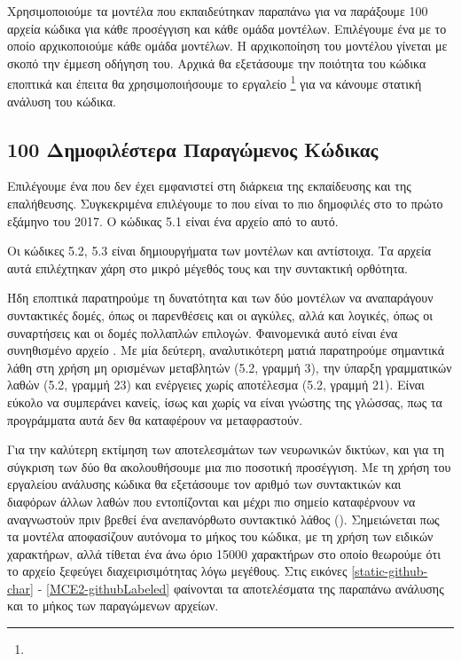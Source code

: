 Χρησιμοποιούμε τα μοντέλα που εκπαιδεύτηκαν παραπάνω για να παράξουμε 100 αρχεία κώδικα για κάθε προσέγγιση και κάθε ομάδα μοντέλων.
Επιλέγουμε ένα  με το οποίο αρχικοποιούμε κάθε ομάδα μοντέλων. 
Η αρχικοποίηση του μοντέλου γίνεται με σκοπό την έμμεση οδήγηση του.
Αρχικά θα εξετάσουμε την ποιότητα του κώδικα εποπτικά και έπειτα θα χρησιμοποιήσουμε το εργαλείο \footnote{} για να κάνουμε στατική ανάλυση του κώδικα.

\subsection{100 Δημοφιλέστερα  Παραγώμενος Κώδικας}

Επιλέγουμε ένα  που δεν έχει εμφανιστεί στη διάρκεια της εκπαίδευσης και της επαλήθευσης.
Συγκεκριμένα επιλέγουμε το  που είναι το πιο δημοφιλές  στο  το πρώτο εξάμηνο του 2017.
Ο κώδικας 5.1 είναι ένα αρχείο από το  αυτό.



Οι κώδικες 5.2, 5.3 είναι δημιουργήματα των μοντέλων  και  αντίστοιχα. Τα αρχεία αυτά επιλέχτηκαν χάρη στο μικρό μέγεθός τους και την συντακτική ορθότητα.

Ήδη εποπτικά παρατηρούμε τη δυνατότητα και των δύο μοντέλων να αναπαράγουν συντακτικές δομές, όπως οι παρενθέσεις και οι αγκύλες, αλλά και λογικές, όπως οι συναρτήσεις και οι δομές πολλαπλών επιλογών.
Φαινομενικά αυτό είναι ένα συνηθισμένο αρχείο .
Με μία δεύτερη, αναλυτικότερη ματιά παρατηρούμε σημαντικά λάθη στη χρήση μη ορισμένων μεταβλητών (5.2, γραμμή 3), την ύπαρξη γραμματικών λαθών (5.2, γραμμή 23) και ενέργειες χωρίς αποτέλεσμα (5.2, γραμμή 21). 
Είναι εύκολο να συμπεράνει κανείς, ίσως και χωρίς να είναι γνώστης της γλώσσας, πως τα προγράμματα αυτά δεν θα καταφέρουν να μεταφραστούν.
\pagebreak


 
Για την καλύτερη εκτίμηση των αποτελεσμάτων των νευρωνικών δικτύων, και για τη σύγκριση των δύο  θα ακολουθήσουμε μια πιο ποσοτική προσέγγιση. 
Με τη χρήση του εργαλείου ανάλυσης κώδικα  θα εξετάσουμε τον αριθμό των συντακτικών και διαφόρων άλλων λαθών  που εντοπίζονται και μέχρι πιο σημείο καταφέρνουν να αναγνωστούν πριν βρεθεί ένα ανεπανόρθωτο συντακτικό λάθος ().
Σημειώνεται πως τα μοντέλα αποφασίζουν αυτόνομα το μήκος του κώδικα, με τη χρήση των ειδικών χαρακτήρων, αλλά τίθεται ένα άνω όριο 15000 χαρακτήρων στο οποίο θεωρούμε ότι το αρχείο ξεφεύγει διαχειρισιμότητας λόγω μεγέθους.
Στις εικόνες \ref{static-github-char} - \ref{MCE2-githubLabeled} φαίνονται τα αποτελέσματα της παραπάνω ανάλυσης και το μήκος των παραγώμενων αρχείων.

